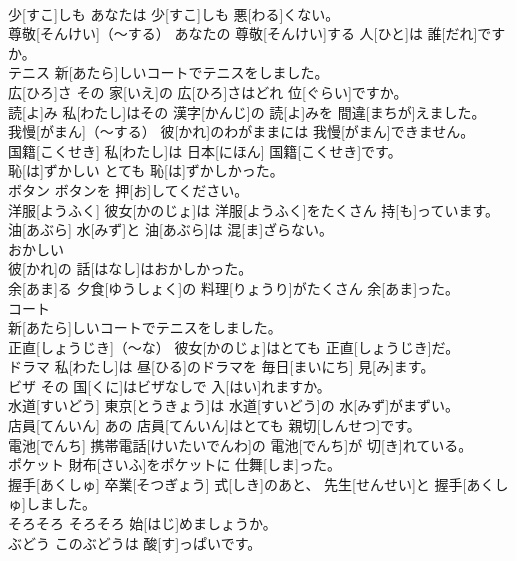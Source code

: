 \documentclass[8pt]{extreport}
\begin{document}
\begin{CJK}{UTF8}{min}
\\	少[すこ]しも	あなたは 少[すこ]しも 悪[わる]くない。		
\\	尊敬[そんけい]（～する）	あなたの 尊敬[そんけい]する 人[ひと]は 誰[だれ]ですか。		
\\	テニス	新[あたら]しいコートでテニスをしました。		
\\	広[ひろ]さ	その 家[いえ]の 広[ひろ]さはどれ 位[ぐらい]ですか。		
\\	読[よ]み	私[わたし]はその 漢字[かんじ]の 読[よ]みを 間違[まちが]えました。		
\\	我慢[がまん]（～する）	彼[かれ]のわがままには 我慢[がまん]できません。		
\\	国籍[こくせき]	私[わたし]は 日本[にほん] 国籍[こくせき]です。		
\\	恥[は]ずかしい	とても 恥[は]ずかしかった。		
\\	ボタン	ボタンを 押[お]してください。		
\\	洋服[ようふく]	彼女[かのじょ]は 洋服[ようふく]をたくさん 持[も]っています。		
\\	油[あぶら]	水[みず]と 油[あぶら]は 混[ま]ざらない。		
\\	おかしい
\\	彼[かれ]の 話[はなし]はおかしかった。		
\\	余[あま]る	夕食[ゆうしょく]の 料理[りょうり]がたくさん 余[あま]った。		
\\	コート
\\	新[あたら]しいコートでテニスをしました。		
\\	正直[しょうじき]（～な）	彼女[かのじょ]はとても 正直[しょうじき]だ。		
\\	ドラマ	私[わたし]は 昼[ひる]のドラマを 毎日[まいにち] 見[み]ます。		
\\	ビザ	その 国[くに]はビザなしで 入[はい]れますか。		
\\	水道[すいどう]	東京[とうきょう]は 水道[すいどう]の 水[みず]がまずい。		
\\	店員[てんいん]	あの 店員[てんいん]はとても 親切[しんせつ]です。		
\\	電池[でんち]	携帯電話[けいたいでんわ]の 電池[でんち]が 切[き]れている。		
\\	ポケット	財布[さいふ]をポケットに 仕舞[しま]った。		
\\	握手[あくしゅ]	卒業[そつぎょう] 式[しき]のあと、 先生[せんせい]と 握手[あくしゅ]しました。		
\\	そろそろ	そろそろ 始[はじ]めましょうか。		
\\	ぶどう	このぶどうは 酸[す]っぱいです。		

\end{CJK}
\end{document}

